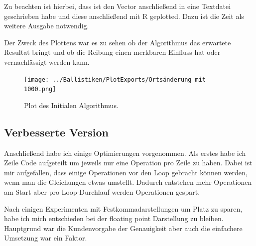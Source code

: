 \documentclass{artilcle}
\begin{document}
    \newpage

    Zu beachten ist hierbei, dass ist den Vector anschließend in eine Textdatei geschrieben habe und diese anschließend
    mit R geplotted. Dazu ist die Zeit als weitere Ausgabe notwendig.

    Der Zweck des Plottens war es zu sehen ob der Algorithmus das erwartete Resultat bringt und ob die Reibung einen
    merkbaren Einfluss hat oder vernachlässigt werden kann.



    \begin{figure}[!htbp]
        \texttt{[image: ../Ballistiken/PlotExports/Ortsänderung mit 1000.png]}
        \caption{Plot des Initialen Algorithmus.}
        \label{Ortsplot initial}
    \end{figure}


    \subsection{Verbesserte Version}

    Anschließend habe ich einige Optimierungen vorgenommen.
    Als erstes habe ich Zeile Code aufgeteilt um jeweils nur eine Operation pro Zeile zu haben.
    Dabei ist mir aufgefallen, dass einige Operationen vor den Loop gebracht können werden, wenn man die Gleichungen
    etwas umstellt. Dadurch entstehen mehr Operationen am Start aber pro Loop-Durchlauf werden Operationen
    gespart.

    \newblock

    Nach einigen Experimenten mit Festkommadarstellungen um Platz zu sparen, habe ich mich entschieden bei der floating
    point Darstellung zu bleiben. Hauptgrund war die Kundenvorgabe der Genauigkeit aber auch die einfachere Umsetzung
    war ein Faktor.

    \newpage
\end{document}
